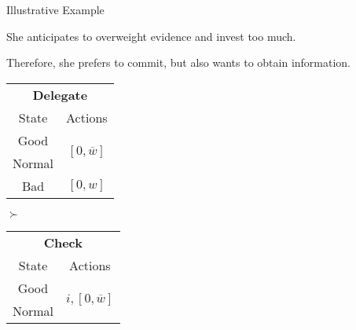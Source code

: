 \documentclass[usenames,dvipsnames,aspectratio=169,11pt, envcountsect]{beamer}
\begin{document}
\begin{frame}[noframenumbering]{Illustrative Example}

	She anticipates to overweight evidence and invest too much.

	\vfill

	Therefore, she prefers to commit, but also wants to obtain information.

	\vfill

	\begin{table}[H]
		\centering
		\begin{minipage}{0.29\textwidth}
			\centering
			\begin{tabular}{c | c}
				\multicolumn{2}{c}{\textbf{Delegate}}                                                                     \\
				State                        & Actions                                                                    \\
				\hline
				{\color{bleudefrance}Good}   & \multirow{2}{*}{{\color{bleudefrance}\( \left[0, \overline{w} \right] \)}} \\
				{\color{bleudefrance}Normal} &                                                                            \\
				Bad                          & \( \left[0, w \right]\)                                                    \\
			\end{tabular}
			\vspace{0.5cm} %
		\end{minipage}\hspace{0.3cm} %
		\( \succ \) %
		\begin{minipage}{0.29\textwidth}
			\centering
			\begin{tabular}{c | c}
				\multicolumn{2}{c}{\textbf{Check}}                                                                            \\
				State                        & Actions                                                                        \\
				\hline
				{\color{bleudefrance}Good}   & \multirow{2}{*}{{\color{bleudefrance}\( i, \left[ 0, \overline{w} \right] \)}} \\
				{\color{bleudefrance}Normal} &                                                                                \\

\end{tabular}
\end{minipage}
\end{table}
\end{frame}
\end{document}
